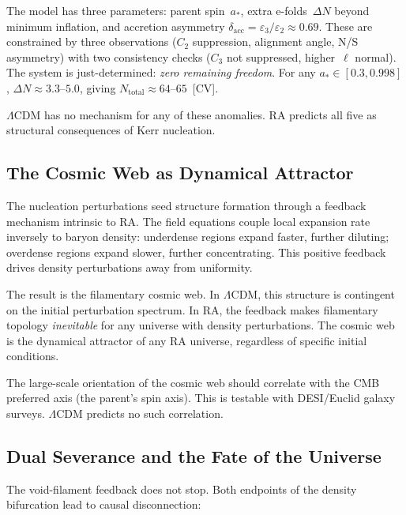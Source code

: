 \documentclass[11pt,a4paper]{article}
\theoremstyle{plain}
\theoremstyle{definition}
\theoremstyle{remark}
\begin{document}
The model has three parameters: parent spin~$a_*$, extra
e-folds~$\Delta N$ beyond minimum inflation, and accretion
asymmetry $\delta_{\mathrm{acc}} =
\varepsilon_3/\varepsilon_2 \approx 0.69$. These are constrained
by three observations ($C_2$ suppression, alignment angle, N/S
asymmetry) with two consistency checks ($C_3$ not suppressed,
higher~$\ell$ normal). The system is just-determined: \emph{zero
remaining freedom}. For any $a_* \in [0.3, 0.998]$,
$\Delta N \approx 3.3$--$5.0$, giving
$N_{\mathrm{total}} \approx 64$--$65$~[CV].

$\Lambda$CDM has no mechanism for any of these anomalies. RA
predicts all five as structural consequences of Kerr nucleation.

\subsection{The Cosmic Web as Dynamical Attractor}
\label{sec:cosmic_web}

The nucleation perturbations seed structure formation through a
feedback mechanism intrinsic to RA. The field equations couple local
expansion rate inversely to baryon density: underdense regions expand
faster, further diluting; overdense regions expand slower, further
concentrating. This positive feedback drives density perturbations
away from uniformity.

The result is the filamentary cosmic web. In $\Lambda$CDM, this
structure is contingent on the initial perturbation spectrum. In RA,
the feedback makes filamentary topology \emph{inevitable} for any
universe with density perturbations. The cosmic web is the dynamical
attractor of any RA universe, regardless of specific initial conditions.

The large-scale orientation of the cosmic web should correlate with the
CMB preferred axis (the parent's spin axis). This is testable with
DESI/Euclid galaxy surveys. $\Lambda$CDM predicts no such correlation.

\subsection{Dual Severance and the Fate of the Universe}
\label{sec:fate}

The void-filament feedback does not stop. Both endpoints of the
density bifurcation lead to causal disconnection:
\end{document}
